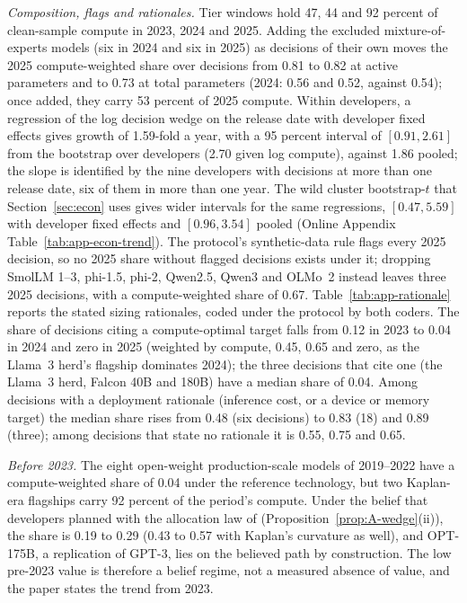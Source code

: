 \textit{Composition, flags and rationales.} Tier windows hold 47, 44 and 92 percent of clean-sample compute in 2023, 2024
and 2025. Adding the excluded mixture-of-experts models (six in 2024 and six in 2025) as decisions of their own moves the
2025 compute-weighted share over decisions from 0.81 to 0.82 at active parameters and to 0.73 at total parameters (2024:
0.56 and 0.52, against 0.54); once added, they carry 53 percent of 2025 compute. Within developers, a regression of the
log decision wedge on the release date with developer fixed effects gives growth of 1.59-fold a year, with a 95 percent
interval of $[0.91,2.61]$ from the bootstrap over developers (2.70 given log compute), against 1.86 pooled; the slope is
identified by the nine developers with decisions at more than one release date, six of them in more than one year. The
wild cluster bootstrap-$t$ that Section~\ref{sec:econ} uses gives wider intervals for the same regressions,
$[0.47,5.59]$ with developer fixed effects and $[0.96,3.54]$ pooled (Online Appendix Table~\ref{tab:app-econ-trend}). The protocol's synthetic-data rule flags every 2025 decision, so no 2025 share without flagged decisions exists
under it; dropping SmolLM 1--3, phi-1.5, phi-2, Qwen2.5, Qwen3 and OLMo~2 instead leaves three 2025 decisions, with a
compute-weighted share of 0.67. Table~\ref{tab:app-rationale} reports the stated sizing rationales, coded under the
protocol by both coders. The share of decisions citing a compute-optimal target falls from 0.12 in 2023 to 0.04 in 2024
and zero in 2025 (weighted by compute, 0.45, 0.65 and zero, as the Llama~3 herd's flagship dominates 2024); the three
decisions that cite one (the Llama~3 herd, Falcon 40B and 180B) have a median share of 0.04. Among decisions with a
deployment rationale (inference cost, or a device or memory target) the median share rises from 0.48 (six decisions) to
0.83 (18) and 0.89 (three); among decisions that state no rationale it is 0.55, 0.75 and 0.65.

\textit{Before 2023.} The eight open-weight production-scale models of 2019--2022 have a compute-weighted share of 0.04
under the reference technology, but two Kaplan-era flagships carry 92 percent of the period's compute. Under the belief
that developers planned with the allocation law of \citet{kaplan2020scaling} (Proposition~\ref{prop:A-wedge}(ii)), the
share is 0.19 to 0.29 (0.43 to 0.57 with Kaplan's curvature as well), and OPT-175B, a replication of GPT-3, lies on the
believed path by construction. The low pre-2023 value is therefore a belief regime, not a measured absence of value, and
the paper states the trend from 2023.

